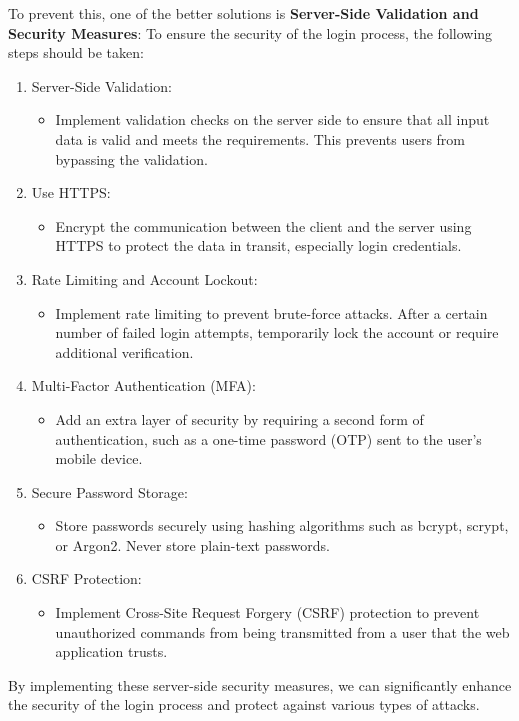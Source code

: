 To prevent this, one of the better solutions is \textbf{Server-Side Validation and Security Measures}:
To ensure the security of the login process, the following steps should be taken:
\begin{enumerate}
\item Server-Side Validation:
        \begin{itemize}
            \item Implement validation checks on the server side to ensure that all input data is valid and meets the requirements. This prevents users from bypassing the validation.
        \end{itemize}
\item Use HTTPS:
    \begin{itemize}
        \item Encrypt the communication between the client and the server using HTTPS to protect the data in transit, especially login credentials.
    \end{itemize}
\item Rate Limiting and Account Lockout:
    \begin{itemize}
        \item Implement rate limiting to prevent brute-force attacks. After a certain number of failed login attempts, temporarily lock the account or require additional verification.
    \end{itemize}
\item Multi-Factor Authentication (MFA):
    \begin{itemize}
        \item Add an extra layer of security by requiring a second form of authentication, such as a one-time password (OTP) sent to the user's mobile device.
    \end{itemize}
\item Secure Password Storage:
    \begin{itemize}
        \item Store passwords securely using hashing algorithms such as bcrypt, scrypt, or Argon2. Never store plain-text passwords.
    \end{itemize}
\item CSRF Protection:
    \begin{itemize}
        \item Implement Cross-Site Request Forgery (CSRF) protection to prevent unauthorized commands from being transmitted from a user that the web application trusts.
    \end{itemize}
\end{enumerate}
By implementing these server-side security measures, we can significantly enhance the security of the login process and protect against various types of attacks.


